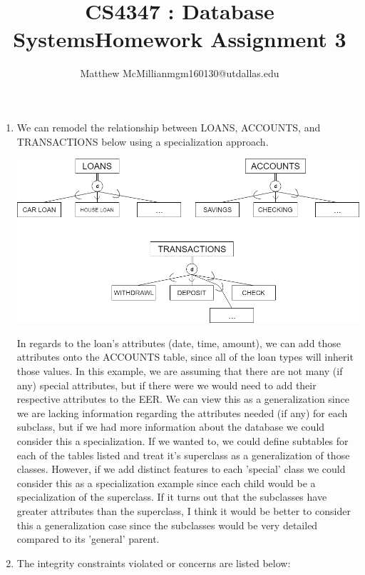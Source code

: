 \documentclass[12pt]{article}
\begin{document}
\title{CS4347 : Database SystemsHomework Assignment 3}
\author{Matthew McMillianmgm160130@utdallas.edu}
\maketitle



\begin{enumerate}
	
	\item We can remodel the relationship between LOANS, ACCOUNTS, and TRANSACTIONS below using a specialization approach. 
		\begin{center}
			\includegraphics[scale=0.45]{eer3}
		\end{center} 
	In regards to the loan's attributes (date, time, amount), we can add those attributes onto the ACCOUNTS table, since all of the loan types will inherit those values. In this example, we are assuming that there are not many (if any) special attributes, but if there were we would need to add their respective attributes to the EER. We can view this as a generalization since we are lacking information regarding the attributes needed (if any) for each subclass, but if we had more information about the database we could consider this a specialization. If we wanted to, we could define subtables for each of the tables listed and treat it's superclass as a generalization of those classes. However, if we add distinct features to each 'special' class we could consider this as a specialization example since each child would be a specialization of the superclass. If it turns out that the subclasses have greater attributes  than the superclass, I think it would be better to consider this a generalization case since the subclasses would be very detailed compared to its 'general' parent.
	\pagebreak
	\item The integrity constraints violated or concerns are listed below:

\end{enumerate}
\end{document}

